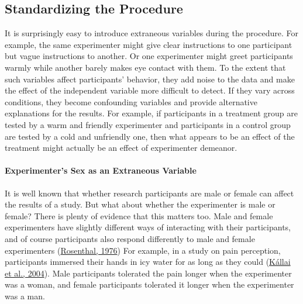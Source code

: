 \documentclass[
]{krantz}
\begin{document}
\hypertarget{standardizing-the-procedure}{%
\subsection*{Standardizing the Procedure}\label{standardizing-the-procedure}}


It is surprisingly easy to introduce extraneous variables during the procedure. For example, the same experimenter might give clear instructions to one participant but vague instructions to another. Or one experimenter might greet participants warmly while another barely makes eye contact with them. To the extent that such variables affect participants' behavior, they add noise to the data and make the effect of the independent variable more difficult to detect. If they vary across conditions, they become confounding variables and provide alternative explanations for the results. For example, if participants in a treatment group are tested by a warm and friendly experimenter and participants in a control group are tested by a cold and unfriendly one, then what appears to be an effect of the treatment might actually be an effect of experimenter demeanor.

\hypertarget{experimenters-sex-as-an-extraneous-variable}{%
\paragraph*{Experimenter's Sex as an Extraneous Variable}\label{experimenters-sex-as-an-extraneous-variable}}

It is well known that whether research participants are male or female can affect the results of a study. But what about whether the experimenter is male or female? There is plenty of evidence that this matters too. Male and female experimenters have slightly different ways of interacting with their participants, and of course participants also respond differently to male and female experimenters (\protect\hyperlink{ref-rosenthal1976experimenter}{Rosenthal, 1976}) For example, in a study on pain perception, participants immersed their hands in icy water for as long as they could (\protect\hyperlink{ref-kallai2004effects}{Kállai et al., 2004}). Male participants tolerated the pain longer when the experimenter was a woman, and female participants tolerated it longer when the experimenter was a man.
\end{document}
